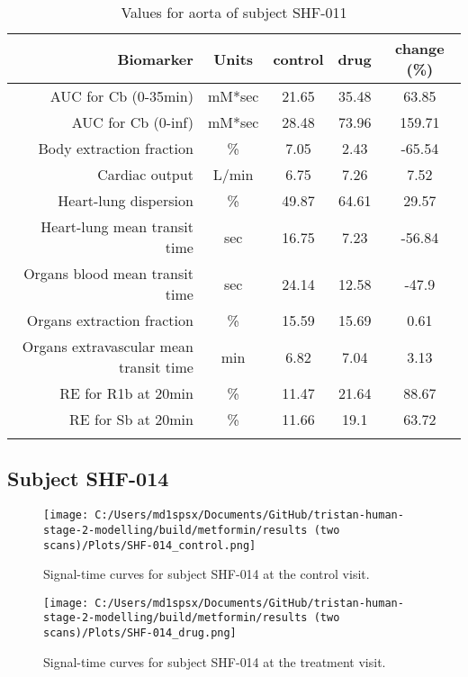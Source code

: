 \documentclass{epflreport}%
\begin{document}
\begin{longtable}{rcccc}%
\hline%
Biomarker&Units&control&drug&change (\%)\\%
\hline%
AUC for Cb (0{-}35min)&mM*sec&21.65&35.48&63.85\\%
AUC for Cb (0{-}inf)&mM*sec&28.48&73.96&159.71\\%
Body extraction fraction&\%&7.05&2.43&{-}65.54\\%
Cardiac output&L/min&6.75&7.26&7.52\\%
Heart{-}lung dispersion&\%&49.87&64.61&29.57\\%
Heart{-}lung mean transit time&sec&16.75&7.23&{-}56.84\\%
Organs blood mean transit time&sec&24.14&12.58&{-}47.9\\%
Organs extraction fraction&\%&15.59&15.69&0.61\\%
Organs extravascular mean transit time&min&6.82&7.04&3.13\\%
RE for R1b at 20min&\%&11.47&21.64&88.67\\%
RE for Sb at 20min&\%&11.66&19.1&63.72\\%
\hline%
\caption{Values for aorta of subject SHF-011} \\%
\end{longtable}%
\clearpage%
\subsection{Subject SHF{-}014}%
\label{subsec:SubjectSHF{-}014}%

%


\begin{figure}[h!]%
\centering%
\texttt{[image: C:/Users/md1spsx/Documents/GitHub/tristan-human-stage-2-modelling/build/metformin/results (two scans)/Plots/SHF-014\_control.png]}%
\caption{Signal{-}time curves for subject SHF{-}014 at the control visit.}%
\end{figure}

%


\begin{figure}[h!]%
\centering%
\texttt{[image: C:/Users/md1spsx/Documents/GitHub/tristan-human-stage-2-modelling/build/metformin/results (two scans)/Plots/SHF-014\_drug.png]}%
\caption{Signal{-}time curves for subject SHF{-}014 at the treatment visit.}%
\end{figure}
\end{document}
